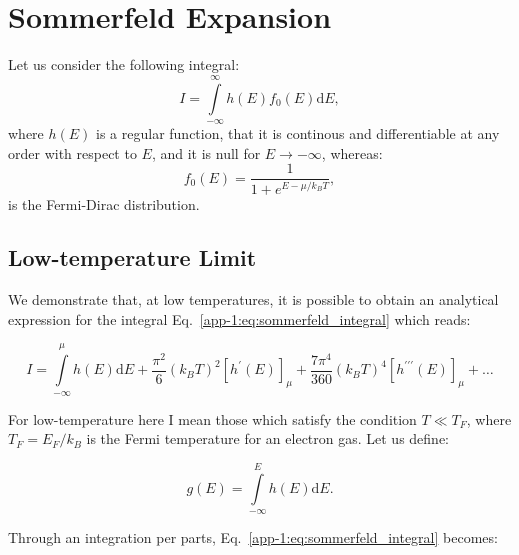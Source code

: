 

\chapter{\label{appendix:sommerfeld}Sommerfeld Expansion}

\minitoc

Let us consider the following integral:
\begin{equation}\label{app-1:eq:sommerfeld_integral}
  I=\int\limits_{-\infty}^{\infty} h(E) f_{0}(E) \text{d} E,
\end{equation}
where $h(E)$ is a regular function, that it is continous and differentiable
at any order with respect to $E$, and it is null for $E\longrightarrow -\infty$, whereas:
$$
  f_0(E) = \frac{1}{1+e^{ E - \mu/k_BT}},
$$
is the Fermi-Dirac distribution.


\section{Low-temperature Limit}
\label{sec:anatomy}

We demonstrate that, at low temperatures, it is possible to obtain an analytical expression for the integral Eq.~\ref{app-1:eq:sommerfeld_integral} which reads:

\begin{equation}
  I=\int\limits_{-\infty}^{\mu} h(E) \text{d}E+\frac{\pi^{2}}{6}\left(k_{B} T\right)^{2}\left[h^{\prime}(E)\right]_{\mu}+\frac{7 \pi^{4}}{360}\left(k_{B} T\right)^{4}\left[h^{\prime \prime \prime}(E)\right]_{\mu}+\ldots
\end{equation}

For low-temperature here I mean those which satisfy the condition $T \ll T_F$, where $T_F = E_F/k_B$ is the Fermi temperature for an electron gas.
Let us define:

$$
  g(E) = \int\limits_{-\infty}^{E}h(E)\text{d}E.
$$

Through an integration per parts, Eq.~\ref{app-1:eq:sommerfeld_integral}
becomes:

